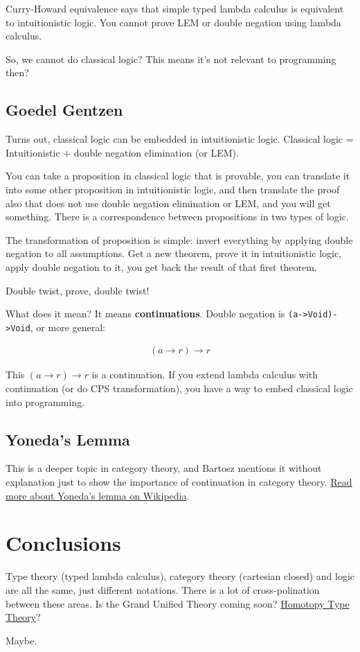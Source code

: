 \documentclass[11pt]{article}
\begin{document}
Curry-Howard equivalence says that simple typed lambda calculus is equivalent to intuitionistic logic. You cannot prove LEM or double negation using lambda calculus.

So, we cannot do classical logic? This means it's not relevant to programming then?

\subsection{Goedel Gentzen}
\label{sec:org45fe406}

Turns out, classical logic can be embedded in intuitionistic logic. Classical logic = Intuitionistic + double negation elimination (or LEM).

You can take a proposition in classical logic that is provable, you can translate it into some other proposition in intuitionistic logic, and then translate the proof also that does not use double negation elimination or LEM, and you will get something. There is a correspondence between propositions in two types of logic.

The transformation of proposition is simple: invert everything by applying double negation to all assumptions. Get a new theorem, prove it in intuitionistic logic, apply double negation to it, you get back the result of that first theorem.

Double twist, prove, double twist!

What does it mean? It means \textbf{continuations}. Double negation is \texttt{(a->Void)->Void}, or more general:

\begin{eqnarray}
(a\rightarrow r)\rightarrow r
\end{eqnarray}

This \((a\rightarrow r)\rightarrow r\) is a continuation. If you extend lambda calculus with continuation (or do CPS transformation), you have a way to embed classical logic into programming.

\subsection{Yoneda's Lemma}
\label{sec:org72b34e9}

This is a deeper topic in category theory, and Bartosz mentions it without explanation just to show the importance of continuation in category theory. \href{https://en.wikipedia.org/wiki/Yoneda\_lemma}{Read more about Yoneda's lemma on Wikipedia}.

\section{Conclusions}
\label{sec:org0fa518a}

Type theory (typed lambda calculus), category theory (cartesian closed) and logic are all the same, just different notations. There is a lot of cross-polination between these areas. Is the Grand Unified Theory coming soon? \href{https://en.wikipedia.org/wiki/Homotopy\_type\_theory}{Homotopy Type Theory}?

Maybe.
\end{document}
